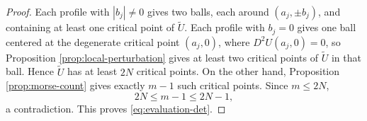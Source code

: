 \documentclass[10pt,a4paper]{amsart}
\begin{document}
\begin{proof}
		Each profile with $|b_j| \neq 0$ gives two balls, each around $(a_j,\pm b_j)$, and containing at least one critical point of $\widetilde U$. Each profile with $b_j=0$ gives one ball centered at the degenerate critical point $(a_j,0)$, where $D^2U(a_j,0)=0$, so Proposition \ref{prop:local-perturbation} gives at least two critical points of $\widetilde U$ in that ball. Hence $\widetilde U$ has at least $2N$ critical points. On the other hand, Proposition \ref{prop:morse-count} gives exactly $m-1$ such critical points. Since $m\leq2N$,
		\[
		2N\leq m-1\leq2N-1,
		\]
		a contradiction. This proves \eqref{eq:evaluation-det}.
	\end{proof}
\end{document}
